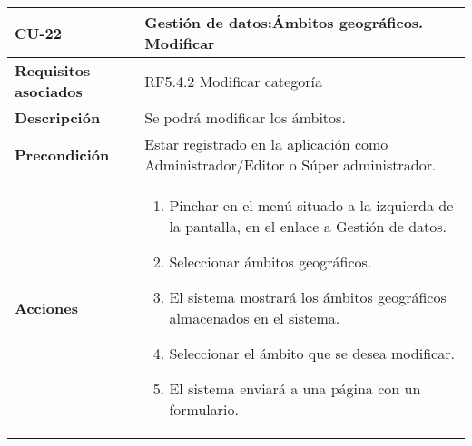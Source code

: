 \newpage
\begin{longtable}[H]{@{}ll@{}}
\toprule
\begin{minipage}[b]{0.23\columnwidth}\raggedright\strut
\textbf{CU-22}\strut
\end{minipage} & \begin{minipage}[b]{0.71\columnwidth}\raggedright\strut
\textbf{Gestión de datos:Ámbitos geográficos. Modificar}\strut
\end{minipage}\tabularnewline
\midrule
\endhead
\begin{minipage}[t]{0.23\columnwidth}\raggedright\strut
\textbf{Requisitos asociados}\strut
\end{minipage} & \begin{minipage}[t]{0.71\columnwidth}\raggedright\strut
RF5.4.2 Modificar categoría\strut
\end{minipage}\tabularnewline
\begin{minipage}[t]{0.23\columnwidth}\raggedright\strut
\textbf{Descripción}\strut
\end{minipage} & \begin{minipage}[t]{0.71\columnwidth}\raggedright\strut
Se podrá modificar los ámbitos.
\strut
\end{minipage}\tabularnewline
\begin{minipage}[t]{0.23\columnwidth}\raggedright\strut
\textbf{Precondición}\strut
\end{minipage} & \begin{minipage}[t]{0.71\columnwidth}\raggedright\strut
Estar registrado en la aplicación como Administrador/Editor o Súper administrador.\strut
\end{minipage}\tabularnewline
\begin{minipage}[t]{0.23\columnwidth}\raggedright\strut
\textbf{Acciones}\strut
\end{minipage} & \begin{minipage}[t]{0.71\columnwidth}\raggedright\strut
\begin{enumerate}
\def\labelenumi{\arabic{enumi}.}
\tightlist
\item
Pinchar en el menú situado a la izquierda de la pantalla, en el
enlace a Gestión de datos.
\item
Seleccionar ámbitos geográficos.
\item
El sistema mostrará los ámbitos geográficos almacenados en el sistema.
\item
Seleccionar el ámbito que se desea modificar.
\item
El sistema enviará a una página con un formulario.

\end{enumerate}
\end{minipage}
\end{longtable}
